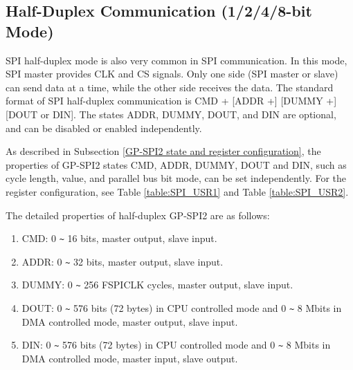 \documentclass[main\_\_EN.tex]{subfiles}
\begin{document}
\subsection{Half-Duplex Communication (1/2/4/8-bit Mode)}
\label{GP-SPI2 1, 2, 4, 8 bits}

SPI half-duplex mode is also very common in SPI communication. In this mode, SPI master provides CLK and CS signals. Only one side (SPI master or slave) can send data at a time, while the other side receives the data. The standard format of SPI half-duplex communication is CMD + [ADDR +] [DUMMY +] [DOUT or DIN]. The states ADDR, DUMMY, DOUT, and DIN are optional, and can be disabled or enabled independently.

As described in Subsection \ref{GP-SPI2 state and register configuration}, the properties of GP-SPI2 states CMD, ADDR, DUMMY, DOUT and DIN, such as cycle length, value, and parallel bus bit mode, can be set independently. For the register configuration, see Table \ref{table:SPI_USR1} and Table \ref{table:SPI_USR2}.

The detailed properties of half-duplex GP-SPI2 are as follows:

\begin{enumerate}
    \item CMD: 0 \verb+~+ 16 bits, master output, slave input.
    \item ADDR: 0 \verb+~+ 32 bits, master output, slave input.
    \item DUMMY: 0 \verb+~+ 256 FSPICLK cycles, master output, slave input.
    \item DOUT: 0 \verb+~+ 576 bits (72 bytes) in CPU controlled mode and 0 \verb+~+ 8 Mbits in DMA controlled mode, master output, slave input.

    \item DIN: 0 \verb+~+ 576 bits (72 bytes) in CPU controlled mode and 0 \verb+~+ 8 Mbits in DMA controlled mode, master input, slave output.
\end{enumerate}
\end{document}

